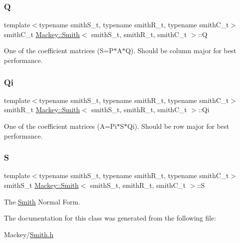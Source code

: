 \subsubsection{\texorpdfstring{Q}{Q}}
{\footnotesize\ttfamily template$<$typename smith\+S\+\_\+t, typename smith\+R\+\_\+t, typename smith\+C\+\_\+t$>$ \\
smith\+C\+\_\+t \hyperlink{classMackey_1_1Smith}{Mackey\+::\+Smith}$<$ smith\+S\+\_\+t, smith\+R\+\_\+t, smith\+C\+\_\+t $>$\+::Q}



One of the coefficient matrices (S=P$\ast$\+A$\ast$Q). Should be column major for best performance. 

\mbox{\label{classMackey_1_1Smith_ade9f9fbe25629c7e20bc9cfe69ee91ad}} 
\subsubsection{\texorpdfstring{Qi}{Qi}}
{\footnotesize\ttfamily template$<$typename smith\+S\+\_\+t, typename smith\+R\+\_\+t, typename smith\+C\+\_\+t$>$ \\
smith\+R\+\_\+t \hyperlink{classMackey_1_1Smith}{Mackey\+::\+Smith}$<$ smith\+S\+\_\+t, smith\+R\+\_\+t, smith\+C\+\_\+t $>$\+::Qi}



One of the coefficient matrices (A=Pi$\ast$\+S$\ast$\+Qi). Should be row major for best performance. 

\mbox{\label{classMackey_1_1Smith_a676606c4002b08a37f0ea11dc3686dbe}} 
\subsubsection{\texorpdfstring{S}{S}}
{\footnotesize\ttfamily template$<$typename smith\+S\+\_\+t, typename smith\+R\+\_\+t, typename smith\+C\+\_\+t$>$ \\
smith\+S\+\_\+t \hyperlink{classMackey_1_1Smith}{Mackey\+::\+Smith}$<$ smith\+S\+\_\+t, smith\+R\+\_\+t, smith\+C\+\_\+t $>$\+::S}



The \hyperlink{classMackey_1_1Smith}{Smith} Normal Form. 



The documentation for this class was generated from the following file\+:\begin{DoxyCompactItemize}
\item 
Mackey/\hyperlink{Smith_8h}{Smith.\+h}\end{DoxyCompactItemize}
